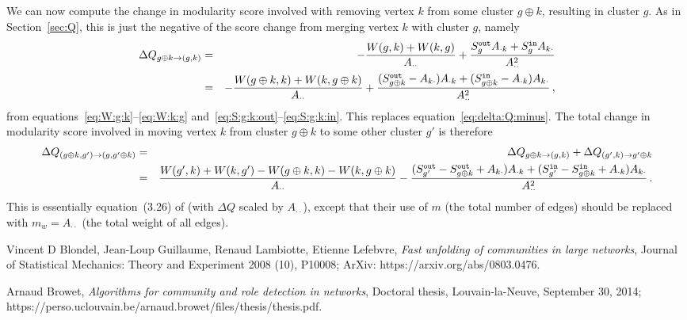 \documentclass[a4paper]{article}
\begin{document}
We can now compute the change in modularity score involved with removing vertex $k$ from some cluster $g\oplus k$, resulting in cluster $g$.
As in Section~\ref{sec:Q}, this is just the negative of the score change from merging vertex $k$ with cluster $g$, namely
\begin{eqnarray}
    \Delta Q_{g\oplus k\rightarrow (g,k)} & = & 
    -\frac{W(g,k)+W(k,g)}{A_{\cdot\cdot}}+\frac{S_{g}^{\tt out}A_{\cdot k}+S_{g}^{\tt in}A_{k\cdot}}{A_{\cdot\cdot}^2}
\nonumber\\&=&    
    -\frac{W(g\oplus k,k)+W(k,g\oplus k)}{A_{\cdot\cdot}}
    +\frac{(S_{g\oplus k}^{\tt out}-A_{k\cdot})A_{\cdot k}+(S_{g\oplus k}^{\tt in}-A_{\cdot k})A_{k\cdot}}{A_{\cdot\cdot}^2}
\,,
\end{eqnarray}
from equations~\eqref{eq:W:g:k}--\eqref{eq:W:k:g} and~\eqref{eq:S:g:k:out}--\eqref{eq:S:g:k:in}. This replaces equation~\eqref{eq:delta:Q:minus}.
The total change in modularity score involved in moving vertex $k$ from cluster $g\oplus k$ to some other cluster $g'$ is therefore
\begin{eqnarray}
    \Delta Q_{(g\oplus k,g')\rightarrow(g,g'\oplus k)} & = & \Delta Q_{g\oplus k\rightarrow(g,k)} + 
    \Delta Q_{(g',k)\rightarrow g'\oplus k}
\nonumber\\
& = &
\frac{W(g',k)+W(k,g')-W(g\oplus k,k)-W(k,g\oplus k)}{A_{\cdot\cdot}}
-\frac{(S_{g'}^{\tt out}-S_{g\oplus k}^{\tt out}+A_{k\cdot})A_{\cdot k}+(S_{g'}^{\tt in}-S_{g\oplus k}^{\tt in}+A_{\cdot k})A_{k\cdot}}
{A_{\cdot\cdot}^2}
\,.
\end{eqnarray}
This is essentially equation~(3.26) of \cite{browet14} (with $\Delta Q$ scaled by $A_{\cdot\cdot}$), except that their use of $m$ 
(the total number of edges) should be
replaced with $m_w=A_{\cdot\cdot}$ (the total weight of all edges).

\begin{thebibliography}{9}

  Vincent D Blondel, Jean-Loup Guillaume, Renaud Lambiotte, Etienne Lefebvre,
  \textit{Fast unfolding of communities in large networks},
  Journal of Statistical Mechanics: Theory and Experiment 2008 (10), P10008; ArXiv: https://arxiv.org/abs/0803.0476.

  Arnaud Browet,
  \textit{Algorithms for community and role detection in networks},
  Doctoral thesis, Louvain-la-Neuve, September 30, 2014;
  https://perso.uclouvain.be/arnaud.browet/files/thesis/thesis.pdf.

\end{thebibliography}
\end{document}

